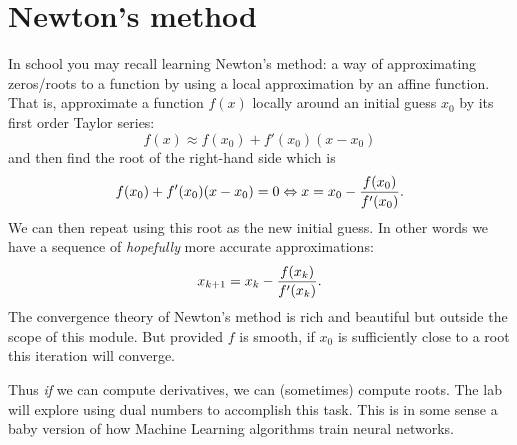 
\section{Newton's method}
In school you may recall learning Newton's method: a way of approximating zeros/roots to a function by using a local approximation by an affine function. That is, approximate a function $f(x)$ locally around an initial guess $x_0$ by its first order Taylor series:
\[
f(x) \ensuremath{\approx} f(x_0) + f'(x_0) (x-x_0)
\]
and then find the root of the right-hand side which is
\[
 f(x_0) + f'(x_0) (x-x_0) = 0 \ensuremath{\Leftrightarrow} x = x_0 - {f(x_0) \over f'(x_0)}.
\]
We can then repeat using this root as the new initial guess. In other words we have a sequence of \emph{hopefully} more accurate approximations:
\[
x_{k+1} = x_k - {f(x_k) \over f'(x_k)}.
\]
The convergence theory of Newton's method is rich and beautiful but outside the scope of this module. But provided $f$ is smooth, if $x_0$ is sufficiently close to a root this iteration will converge. 

Thus \emph{if} we can compute derivatives, we can (sometimes) compute roots. The lab will explore using dual numbers to accomplish this task. This is in some sense a baby version of how Machine Learning algorithms train neural networks.



